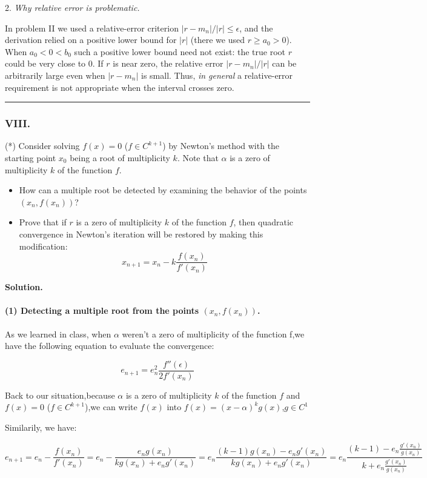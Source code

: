 \documentclass[a4paper]{article}
\begin{document}
2. \emph{Why relative error is problematic.} 

In problem II we used a
relative-error criterion \(|r-m_n|/|r|\le\epsilon\), and the derivation
relied on a positive lower bound for \(|r|\) (there we used \(r\ge a_0>0\)).
When \(a_0<0<b_0\) such a positive lower bound need not exist: the true
root \(r\) could be very close to \(0\). If \(r\) is near zero, the
relative error \(|r-m_n|/|r|\) can be arbitrarily large even when
\(|r-m_n|\) is small. Thus, \emph{in general} a relative-error requirement
is not appropriate when the interval crosses zero.




\noindent\rule{\textwidth}{.4pt}

\subsubsection*{VIII.}
(*) Consider solving $f(x) = 0$ ($f \in C^{k+1}$) by Newton's method with the starting point $x_0$ being a root of multiplicity $k$. Note that $\alpha$ is a zero of multiplicity $k$ of the function $f$.
\begin{itemize}
    \item How can a multiple root be detected by examining the behavior of the points $(x_n, f(x_n))$?
    \item Prove that if $r$ is a zero of multiplicity $k$ of the function $f$, then quadratic convergence in Newton's iteration will be restored by making this modification:
    \[
    x_{n+1} = x_n - k \frac{f(x_n)}{f'(x_n)}
    \]
\end{itemize}

\textbf{Solution.}
\paragraph{(1) Detecting a multiple root from the points $(x_n,f(x_n))$.}


As we learned in class, when $\alpha$ weren't a zero of multiplicity of the function f,we have the following equation to evaluate the convergence:

\[
e_{n+1} = e_n^2 \frac{f''(\epsilon)}{2f'(x_n)}
\]

Back to our situation,because $\alpha$ is a zero of multiplicity $k$ of the function $f$ and  $f(x) = 0$ ($f \in C^{k+1}$),we can write $f(x)$ into $f(x) = (x - \alpha)^kg(x)$,$g \in C^{1}$

Similarily, we have:

\[
e_{n+1} = e_n - \frac{f(x_n)}{f'(x_n)}= e_n - \frac{e_ng(x_n)}{kg(x_n) + e_ng'(x_n)}=e_n\frac{(k-1)g(x_n)-e_ng'(x_n)}{kg(x_n) + e_ng'(x_n)}=e_n\frac{(k-1)-e_n\frac{g'(x_n)}{g(x_n)}}{k + e_n\frac{g'(x_n)}{g(x_n)}}
\]
\end{document}
